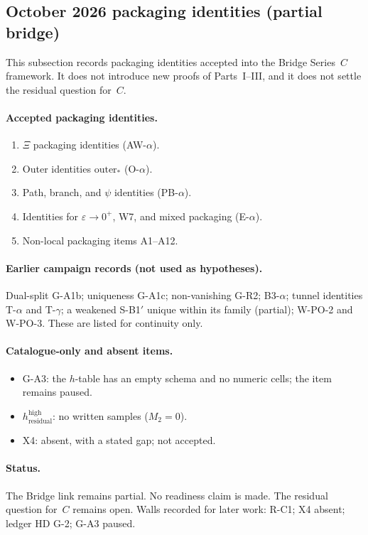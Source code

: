 \subsection{October 2026 packaging identities (partial bridge)}\label{sec:partial13}
This subsection records packaging identities accepted into the Bridge Series~$C$ framework. It does not introduce new proofs of Parts~I--III, and it does not settle the residual question for~$C$.

\paragraph{Accepted packaging identities.}
\begin{enumerate}
\item $\Xi$ packaging identities (AW-$\alpha$).
\item Outer identities $\mathrm{outer}_*$ (O-$\alpha$).
\item Path, branch, and $\psi$ identities (PB-$\alpha$).
\item Identities for $\varepsilon\to0^+$, W7, and mixed packaging (E-$\alpha$).
\item Non-local packaging items A1--A12.
\end{enumerate}

\paragraph{Earlier campaign records (not used as hypotheses).}
Dual-split G-A1b; uniqueness G-A1c; non-vanishing G-R2; B3-$\alpha$; tunnel identities T-$\alpha$ and T-$\gamma$; a weakened S-B1$'$ unique within its family (partial); W-PO-2 and W-PO-3. These are listed for continuity only.

\paragraph{Catalogue-only and absent items.}
\begin{itemize}
\item G-A3: the $h$-table has an empty schema and no numeric cells; the item remains paused.
\item $h_{\mathrm{residual}}^{\mathrm{high}}$: no written samples ($M_2=0$).
\item X4: absent, with a stated gap; not accepted.
\end{itemize}

\paragraph{Status.}
The Bridge link remains partial. No readiness claim is made. The residual question for~$C$ remains open. Walls recorded for later work: R-C1; X4 absent; ledger HD G-2; G-A3 paused.

